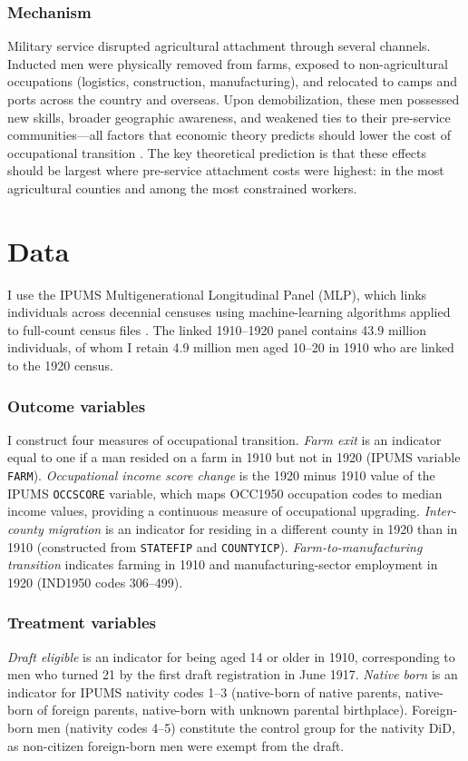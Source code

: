 \documentclass[12pt]{article}
\begin{document}
\subsubsection*{Mechanism} Military service disrupted agricultural attachment through several channels. Inducted men were physically removed from farms, exposed to non-agricultural occupations (logistics, construction, manufacturing), and relocated to camps and ports across the country and overseas. Upon demobilization, these men possessed new skills, broader geographic awareness, and weakened ties to their pre-service communities---all factors that economic theory predicts should lower the cost of occupational transition \citep{lagakos2018, donaldson2018}. The key theoretical prediction is that these effects should be largest where pre-service attachment costs were highest: in the most agricultural counties and among the most constrained workers.

\section{Data}

I use the IPUMS Multigenerational Longitudinal Panel (MLP), which links individuals across decennial censuses using machine-learning algorithms applied to full-count census files \citep{price2022, abramitzky2021}. The linked 1910--1920 panel contains 43.9 million individuals, of whom I retain 4.9 million men aged 10--20 in 1910 who are linked to the 1920 census.

\subsubsection*{Outcome variables} I construct four measures of occupational transition. \textit{Farm exit} is an indicator equal to one if a man resided on a farm in 1910 but not in 1920 (IPUMS variable \texttt{FARM}). \textit{Occupational income score change} is the 1920 minus 1910 value of the IPUMS \texttt{OCCSCORE} variable, which maps OCC1950 occupation codes to median income values, providing a continuous measure of occupational upgrading. \textit{Inter-county migration} is an indicator for residing in a different county in 1920 than in 1910 (constructed from \texttt{STATEFIP} and \texttt{COUNTYICP}). \textit{Farm-to-manufacturing transition} indicates farming in 1910 and manufacturing-sector employment in 1920 (IND1950 codes 306--499).

\subsubsection*{Treatment variables} \textit{Draft eligible} is an indicator for being aged 14 or older in 1910, corresponding to men who turned 21 by the first draft registration in June 1917. \textit{Native born} is an indicator for IPUMS nativity codes 1--3 (native-born of native parents, native-born of foreign parents, native-born with unknown parental birthplace). Foreign-born men (nativity codes 4--5) constitute the control group for the nativity DiD, as non-citizen foreign-born men were exempt from the draft.
\end{document}
